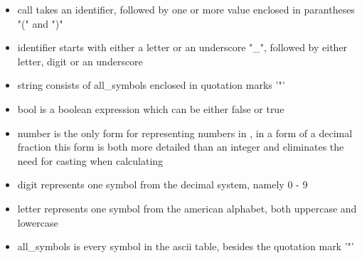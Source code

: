 \begin{itemize}
\item call takes an identifier, followed by one or more value enclosed in parantheses "(" and ")"

\item identifier starts with either a letter or an underscore "\_", followed by either letter, digit or
an underscore

\item string consists of all\_symbols enclosed in quotation marks '"'

\item bool is a boolean expression which can be either false or true

\item number is the only form for representing numbers in \langname{}, in a form of a decimal fraction
this form is both more detailed than an integer and eliminates the need for casting when calculating

\item digit represents one symbol from the decimal system, namely 0 - 9

\item letter represents one symbol from the american alphabet, both uppercase and lowercase

\item all\_symbols is every symbol in the ascii table, besides the quotation mark '"'

\end{itemize}